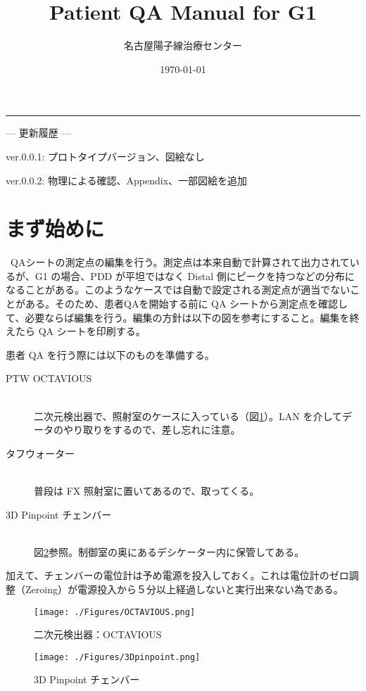 \documentclass[11pt,a4paper]{jsarticle}
\title{Patient QA Manual for G1}
\author{名古屋陽子線治療センター}
\date{\today}
\makeatletter
\newcommand{\noindot}{\noindent{$\cdot$}} %
\newcommand{\rev}[2]{ver.{#1}: #2} %
\renewcommand{\maketitle}{\begin{titlepage}%
    \let\footnotesize\small
    \let\footnoterule\relax
    \parindent \z@
    \reset@font
    \null\vfil
    \begin{flushleft}
      \huge \@title
    \end{flushleft}
    \par
    \hrule height 4pt
    \par
    \begin{flushright}
      \LARGE \@author \par
    \end{flushright}
    \vskip 20\p@
    \begin{flushright}
    	--- 更新履歴 --- \par
	\rev{0.0.1}{プロトタイプバージョン、図絵なし}\par
	\rev{0.0.2}{物理による確認、Appendix、一部図絵を追加}\par
    \end{flushright}
    \vskip 60\p@
    \vfil\null
    \begin{flushright}
        {\small \@date}%
    \end{flushright}
  \end{titlepage}%
  \setcounter{footnote}{0}%
}
\makeatother
\begin{document}
%
\maketitle
%
\section{まず始めに}
\noindot ~QAシートの測定点の編集を行う。測定点は本来自動で計算されて出力されているが、G1 の場合、PDD が平坦ではなく Distal 側にピークを持つなどの分布になることがある。このようなケースでは自動で設定される測定点が適当でないことがある。そのため、患者QAを開始する前に QA シートから測定点を確認して、必要ならば編集を行う。編集の方針は以下の図を参考にすること。編集を終えたら QA シートを印刷する。\par
\noindot 患者 QA を行う際には以下のものを準備する。
	\begin{description}
		\item[PTW OCTAVIOUS]\mbox{}\\
		二次元検出器で、照射室のケースに入っている（図\ref{fig:OCTAVIOUS}）。LAN を介してデータのやり取りをするので、差し忘れに注意。
		\item[タフウォーター]\mbox{}\\
		普段は FX 照射室に置いてあるので、取ってくる。
		\item[3D Pinpoint チェンバー]\mbox{}\\
		図\ref{fig:3Dpinpoint}参照。制御室の奥にあるデシケーター内に保管してある。
	\end{description}%
加えて、チェンバーの電位計は予め電源を投入しておく。これは電位計のゼロ調整（Zeroing）が電源投入から５分以上経過しないと実行出来ない為である。
	\begin{figure}[htbp]
		\centering
		\texttt{[image: ./Figures/OCTAVIOUS.png]}
		\caption{二次元検出器：OCTAVIOUS}
		\label{fig:OCTAVIOUS}
	\end{figure}%
	\begin{figure}[htbp]
		\centering
		\texttt{[image: ./Figures/3Dpinpoint.png]}
		\caption{3D Pinpoint チェンバー}
		\label{fig:3Dpinpoint}
	\end{figure}%
	
\end{document}
